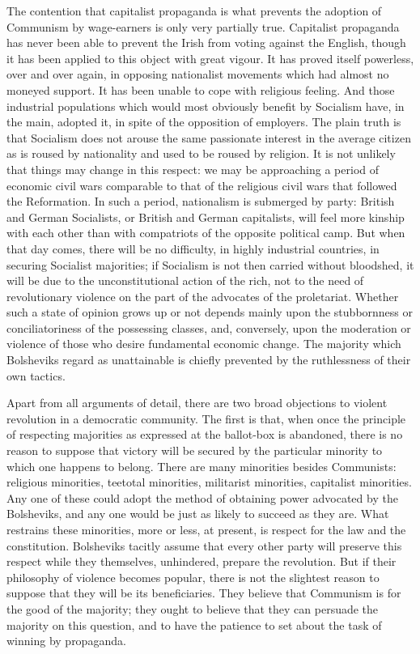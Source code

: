 The contention that capitalist propaganda is what prevents the adoption of Communism by wage-earners is only very partially true. Capitalist propaganda has never been able to prevent the Irish from voting against the English, though it has been applied to this object with great vigour. It has proved itself powerless, over and over again, in opposing nationalist movements which had almost no moneyed support. It has been unable to cope with religious feeling. And those industrial populations which would most obviously benefit by Socialism have, in the main, adopted it, in spite of the opposition of employers. The plain truth is that Socialism does not arouse the same passionate interest in the average citizen as is roused by nationality and used to be roused by religion. It is not unlikely that things may change in this respect: we may be approaching a period of economic civil wars comparable to that of the religious civil wars that followed the Reformation. In such a period, nationalism is submerged by party: British and German Socialists, or British and German capitalists, will feel more kinship with each other than with compatriots of the opposite political camp. But when that day comes, there will be no difficulty, in highly industrial countries, in securing Socialist majorities; if Socialism is not then carried without bloodshed, it will be due to the unconstitutional action of the rich, not to the need of revolutionary violence on the part of the advocates of the proletariat. Whether such a state of opinion grows up or not depends mainly upon the stubbornness or conciliatoriness of the possessing classes, and, conversely, upon the moderation or violence of those who desire fundamental economic change. The majority which Bolsheviks regard as unattainable is chiefly prevented by the ruthlessness of their own tactics.

Apart from all arguments of detail, there are two broad objections to violent revolution in a democratic community. The first is that, when once the principle of respecting majorities as expressed at the ballot-box is abandoned, there is no reason to suppose that victory will be secured by the particular minority to which one happens to belong. There are many minorities besides Communists: religious minorities, teetotal minorities, militarist minorities, capitalist minorities. Any one of these could adopt the method of obtaining power advocated by the Bolsheviks, and any one would be just as likely to succeed as they are. What restrains these minorities, more or less, at present, is respect for the law and the constitution. Bolsheviks tacitly assume that every other party will preserve this respect while they themselves, unhindered, prepare the revolution. But if their philosophy of violence becomes popular, there is not the slightest reason to suppose that they will be its beneficiaries. They believe that Communism is for the good of the majority; they ought to believe that they can persuade the majority on this question, and to have the patience to set about the task of winning by propaganda.

